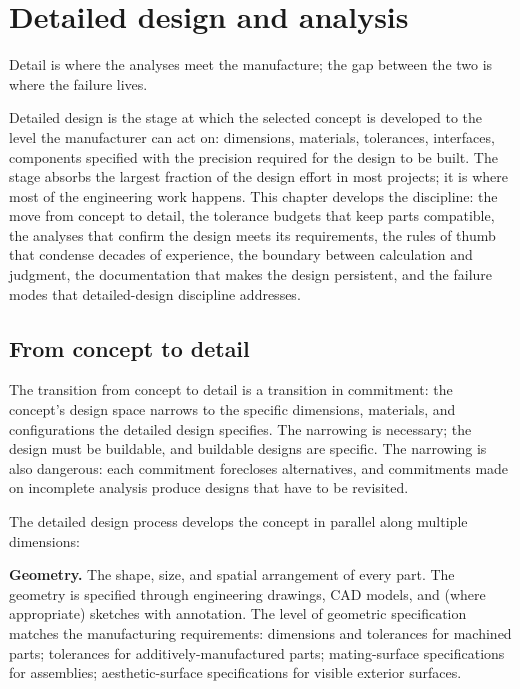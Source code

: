 \chapter{Detailed design and analysis}
\label{vol11:ch05}

\epigraph{Detail is where the analyses meet the manufacture; the gap between the two is where the failure lives.}{}


\noindent
Detailed design is the stage at which the selected concept is developed to the level the manufacturer can act on: dimensions, materials, tolerances, interfaces, components specified with the precision required for the design to be built. The stage absorbs the largest fraction of the design effort in most projects; it is where most of the engineering work happens. This chapter develops the discipline: the move from concept to detail, the tolerance budgets that keep parts compatible, the analyses that confirm the design meets its requirements, the rules of thumb that condense decades of experience, the boundary between calculation and judgment, the documentation that makes the design persistent, and the failure modes that detailed-design discipline addresses.

\section{From concept to detail}

The transition from concept to detail is a transition in commitment: the concept's design space narrows to the specific dimensions, materials, and configurations the detailed design specifies. The narrowing is necessary; the design must be buildable, and buildable designs are specific. The narrowing is also dangerous: each commitment forecloses alternatives, and commitments made on incomplete analysis produce designs that have to be revisited.

The detailed design process develops the concept in parallel along multiple dimensions:

\textbf{Geometry.} The shape, size, and spatial arrangement of every part. The geometry is specified through engineering drawings, CAD models, and (where appropriate) sketches with annotation. The level of geometric specification matches the manufacturing requirements: dimensions and tolerances for machined parts; tolerances for additively-manufactured parts; mating-surface specifications for assemblies; aesthetic-surface specifications for visible exterior surfaces.

